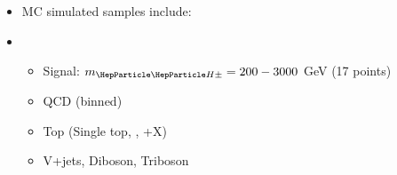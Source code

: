 {  \begin{itemize}
    \small
  \item MC simulated samples include:
  \end{itemize}
  \twoColumnsAsymAlt
      {
        \begin{itemize}          
          \vspace{-0.35cm}
        \item[ ]
          \begin{itemize}
            \footnotesize
          \item Signal: $\mHpm = 200 - 3000$ GeV (17 points)
          \item QCD (\HT binned)
          \item Top (Single top, \ttbar, \ttbar+X)
          \item V+jets, Diboson, Triboson
          \end{itemize}
      \end{itemize}
      }
      {

      }
}



